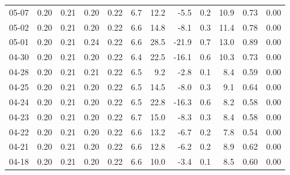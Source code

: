 \begin{threeparttable}
{\begin{tabular}{lrrrrrrrrrrr}
  05-07 &          0.20 &          0.21 &          0.20 &        0.22 &                 6.7 &                12.2 &       -5.5 &                 0.2 &             10.9 &            0.73 &                   0.00 \\
  05-02 &          0.20 &          0.21 &          0.20 &        0.22 &                 6.6 &                14.8 &       -8.1 &                 0.3 &             11.4 &            0.78 &                   0.00 \\
  05-01 &          0.20 &          0.21 &          0.24 &        0.22 &                 6.6 &                28.5 &      -21.9 &                 0.7 &             13.0 &            0.89 &                   0.00 \\
  04-30 &          0.20 &          0.21 &          0.20 &        0.22 &                 6.4 &                22.5 &      -16.1 &                 0.6 &             10.3 &            0.73 &                   0.00 \\
  04-28 &          0.20 &          0.21 &          0.21 &        0.22 &                 6.5 &                 9.2 &       -2.8 &                 0.1 &              8.4 &            0.59 &                   0.00 \\
  04-25 &          0.20 &          0.21 &          0.20 &        0.22 &                 6.5 &                14.5 &       -8.0 &                 0.3 &              9.1 &            0.64 &                   0.00 \\
  04-24 &          0.20 &          0.21 &          0.20 &        0.22 &                 6.5 &                22.8 &      -16.3 &                 0.6 &              8.2 &            0.58 &                   0.00 \\
  04-23 &          0.20 &          0.21 &          0.20 &        0.22 &                 6.7 &                15.0 &       -8.3 &                 0.3 &              8.4 &            0.58 &                   0.00 \\
  04-22 &          0.20 &          0.21 &          0.20 &        0.22 &                 6.6 &                13.2 &       -6.7 &                 0.2 &              7.8 &            0.54 &                   0.00 \\
  04-21 &          0.20 &          0.21 &          0.20 &        0.22 &                 6.6 &                12.8 &       -6.2 &                 0.2 &              8.9 &            0.62 &                   0.00 \\
  04-18 &          0.20 &          0.21 &          0.20 &        0.22 &                 6.6 &                10.0 &       -3.4 &                 0.1 &              8.5 &            0.60 &                   0.00 \\

\end{tabular}}
\end{threeparttable}
